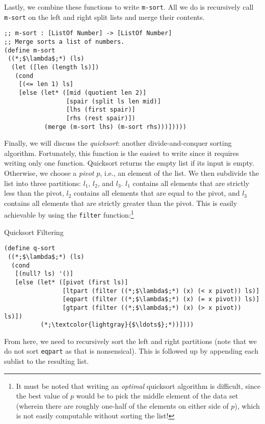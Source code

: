 Lastly, we combine these functions to write \texttt{m-sort}. All we do is recursively call \texttt{m-sort} on the left and right split lists and merge their contents.

\begin{cl}[]{}\begin{lstlisting}[language=MyScheme]
;; m-sort : [ListOf Number] -> [ListOf Number]
;; Merge sorts a list of numbers.
(define m-sort
 ((*;$\lambda$;*) (ls)
  (let ([len (length ls)])
   (cond
    [(<= len 1) ls]
    [else (let* ([mid (quotient len 2)]
                 [spair (split ls len mid)]
                 [lhs (first spair)]
                 [rhs (rest spair)])
           (merge (m-sort lhs) (m-sort rhs)))]))))
\end{lstlisting}\end{cl}

Finally, we will discuss the \textit{quicksort}: another divide-and-conquer sorting algorithm. Fortunately, this function is the easiest to write since it requires writing only one function. Quicksort returns the empty list if its input is empty. Otherwise, we choose a \textit{pivot} $p$, i.e., an element of the list. We then subdivide the list into three partitions: $l_1$, $l_2$, and $l_3$. $l_1$ contains all elements that are strictly less than the pivot, $l_2$ contains all elements that are equal to the pivot, and $l_3$ contains all elements that are strictly greater than the pivot. This is easily achievable by using the \texttt{filter} function:\footnote{It must be noted that writing an \textit{optimal} quicksort algorithm is difficult, since the best value of $p$ would be to pick the middle element of the data set (wherein there are roughly one-half of the elements on either side of $p$), which is not easily computable without sorting the list!}

\begin{cl}[]{Quicksort Filtering}\begin{lstlisting}[language=MyScheme]
(define q-sort
 ((*;$\lambda$;*) (ls)
  (cond
   [(null? ls) '()]
   [else (let* ([pivot (first ls)]
                [ltpart (filter ((*;$\lambda$;*) (x) (< x pivot)) ls)]
                [eqpart (filter ((*;$\lambda$;*) (x) (= x pivot)) ls)]
                [gtpart (filter ((*;$\lambda$;*) (x) (> x pivot)) ls)])
          (*;\textcolor{lightgray}{$\ldots$};*))])))
\end{lstlisting}\end{cl}

From here, we need to recursively sort the left and right partitions (note that we do not sort \texttt{eqpart} as that is nonsensical). This is followed up by appending each sublist to the resulting list.

